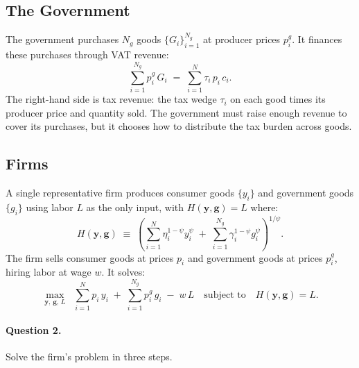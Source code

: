 \subsection{The Government}
\label{subsec:gov-baseline}
 
The government purchases $N_g$ goods $\{G_i\}_{i=1}^{N_g}$ at producer prices $p_i^g$. It finances these purchases through VAT revenue:
%
\begin{equation}
    \sum_{i=1}^{N_g} p_i^g\, G_i \;=\; \sum_{i=1}^{N} \tau_i\, p_i\, c_i.
    \label{eq:gov-budget-baseline}
\end{equation}
%
The right-hand side is tax revenue: the tax wedge $\tau_i$ on each good times its producer price and quantity sold. The government must raise enough revenue to cover its purchases, but it chooses how to distribute the tax burden across goods.
 
\subsection{Firms}
\label{subsec:firms-baseline}
 
A single representative firm produces consumer goods $\{y_i\}$ and government goods $\{g_i\}$ using labor $L$ as the only input, with $H(\mathbf{y}, \mathbf{g}) = L$ where:
%
\begin{equation}
    H(\mathbf{y}, \mathbf{g}) \;\equiv\; \left( \sum_{i=1}^{N} \eta_i^{1-\psi} y_i^{\psi} \;+\; \sum_{i=1}^{N_g} \gamma_i^{1-\psi} g_i^{\psi} \right)^{1/\psi}.
    \label{eq:firm-tech}
\end{equation}
%
The firm sells consumer goods at prices $p_i$ and government goods at prices $p_i^g$, hiring labor at wage $w$. It solves:
%
\begin{equation}
    \max_{\mathbf{y},\, \mathbf{g},\, L} \;\; \sum_{i=1}^{N} p_i\, y_i \;+\; \sum_{i=1}^{N_g} p_i^g\, g_i \;-\; w\, L
    \quad \text{subject to} \quad H(\mathbf{y}, \mathbf{g}) = L.
    \label{eq:firm-problem}
\end{equation}
 
\paragraph{Question 2.}
Solve the firm's problem in three steps.
 
